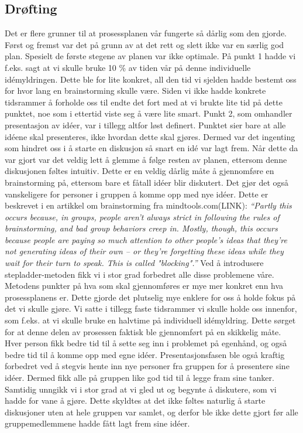 \subsection{Drøfting}
Det er flere grunner til at prosessplanen vår fungerte så dårlig som den gjorde. Først og fremst var det på grunn av at det rett og slett ikke var en særlig god plan. Spesielt de første stegene av planen var ikke optimale. På punkt 1 hadde vi f.eks. sagt at vi skulle bruke 10 \% av tiden vår på denne individuelle idémyldringen. Dette ble for lite konkret, all den tid vi sjelden hadde bestemt oss for hvor lang en brainstorming skulle være. Siden vi ikke hadde konkrete tidsrammer å forholde oss til endte det fort med at vi brukte lite tid på dette punktet, noe som i ettertid viste seg å være lite smart. Punkt 2, som omhandler presentasjon av idéer, var i tillegg altfor løst definert. Punktet sier bare at alle idéene skal presenteres, ikke hvordan dette skal gjøres. Dermed var det ingenting som hindret oss i å starte en diskusjon så snart en idé var lagt frem. Når dette da var gjort var det veldig lett å glemme å følge resten av planen, ettersom denne diskusjonen føltes intuitiv. Dette er en veldig dårlig måte å gjennomføre en brainstorming på, ettersom bare et fåtall idéer blir diskutert. Det gjør det også vanskeligere for personer i gruppen å komme opp med nye idéer. Dette er beskrevet i en artikkel om brainstorming fra mindtools.com(LINK): 
\newline
\emph{“Partly this occurs because, in groups, people aren’t always strict in following the rules of brainstorming, and bad group behaviors creep in. Mostly, though, this occurs because people are paying so much attention to other people’s ideas that they're not generating ideas of their own – or they're forgetting these ideas while they wait for their turn to speak. This is called "blocking".”} 
\newline
Ved å introdusere stepladder-metoden fikk vi i stor grad forbedret alle disse problemene våre. Metodens punkter på hva som skal gjennomføres er mye mer konkret enn hva prosessplanens er. Dette gjorde det plutselig mye enklere for oss å holde fokus på det vi skulle gjøre. Vi satte i tillegg faste tidsrammer vi skulle holde oss innenfor, som f.eks. at vi skulle bruke en halvtime på individuell idémyldring. Dette sørget for at denne delen av prosessen faktisk ble gjennomført på en skikkelig måte. Hver person fikk bedre tid til å sette seg inn i problemet på egenhånd, og også bedre tid til å komme opp med egne idéer. Presentasjonsfasen ble også kraftig forbedret ved å stegvis hente inn nye personer fra gruppen for å presentere sine idéer. Dermed fikk alle på gruppen like god tid til å legge fram sine tanker. Samtidig unngikk vi i stor grad at vi gled ut og begynte å diskutere, som vi hadde for vane å gjøre. Dette skyldtes at det ikke føltes naturlig å starte diskusjoner uten at hele gruppen var samlet, og derfor ble ikke dette gjort før alle gruppemedlemmene hadde fått lagt frem sine idéer. 
